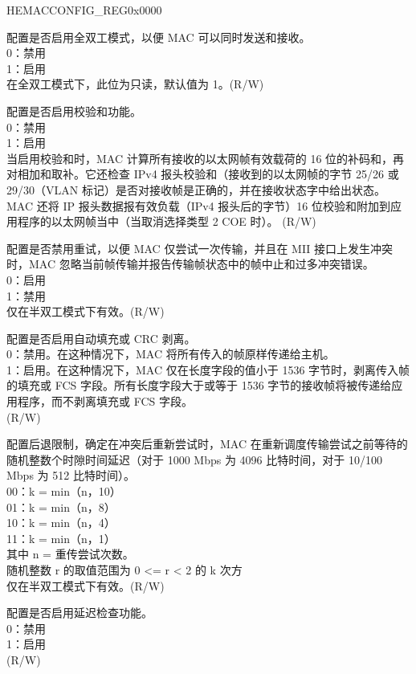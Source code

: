 \addtocounter{Regfloat}{-1}
\begin{register}{H}{EMACCONFIG\_REG}{0x0000}
\begin{regdesc}\begin{reglist}
\item[接上页...]

\item [EMACDUPLEX] 配置是否启用全双工模式，以便 MAC 可以同时发送和接收。\\
0：禁用\\
1：启用\\
在全双工模式下，此位为只读，默认值为 1。(R/W)



\item [EMACRXIPCOFFLOAD] 配置是否启用校验和功能。\\
0：禁用\\
1：启用\\
当启用校验和时，MAC 计算所有接收的以太网帧有效载荷的 16 位的补码和，再对相加和取补。它还检查 IPv4 报头校验和（接收到的以太网帧的字节 25/26 或 29/30（VLAN 标记）是否对接收帧是正确的，并在接收状态字中给出状态。MAC 还将 IP 报头数据报有效负载（IPv4 报头后的字节）16 位校验和附加到应用程序的以太网帧当中（当取消选择类型 2 COE 时）。 (R/W)
\item [EMACRETRY] 配置是否禁用重试，以便 MAC 仅尝试一次传输，并且在 MII 接口上发生冲突时，MAC 忽略当前帧传输并报告传输帧状态中的帧中止和过多冲突错误。\\
0：启用\\
1：禁用\\
仅在半双工模式下有效。(R/W)
\item [EMACPADCRCSTRIP] 配置是否启用自动填充或 CRC 剥离。\\
0：禁用。在这种情况下，MAC 将所有传入的帧原样传递给主机。\\
1：启用。在这种情况下，MAC 仅在长度字段的值小于 1536 字节时，剥离传入帧的填充或 FCS 字段。所有长度字段大于或等于 1536 字节的接收帧将被传递给应用程序，而不剥离填充或 FCS 字段。\\(R/W)
\item [EMACBACKOFFLIMIT] 配置后退限制，确定在冲突后重新尝试时，MAC 在重新调度传输尝试之前等待的随机整数个时隙时间延迟（对于 1000 Mbps 为 4096 比特时间，对于 10/100 Mbps 为 512 比特时间）。\\
00：k = min（n，10）\\
01：k = min（n，8）\\
10：k = min（n，4）\\
11：k = min（n，1）\\
其中 n = 重传尝试次数。\\
随机整数 r 的取值范围为 0 <= r < 2 的 k 次方\\
仅在半双工模式下有效。(R/W)
\item [EMACDEFERRALCHECK] 配置是否启用延迟检查功能。\\
0：禁用\\
1：启用\\(R/W)


\item[见下页...]
\end{reglist}\end{regdesc}
\end{register}
